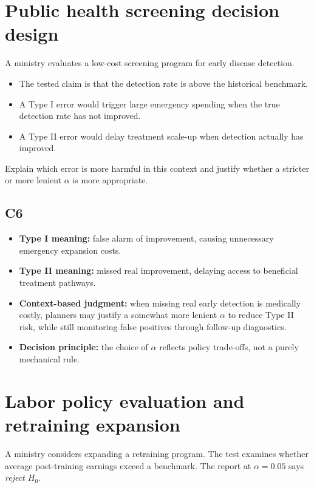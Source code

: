 	\section{Public health screening decision design}
	A ministry evaluates a low-cost screening program for early disease detection.
	\begin{itemize}
		\item The tested claim is that the detection rate is above the historical benchmark.
		\item A Type I error would trigger large emergency spending when the true detection rate has not improved.
		\item A Type II error would delay treatment scale-up when detection actually has improved.
	\end{itemize}
	Explain which error is more harmful in this context and justify whether a stricter or more lenient \(\alpha\) is more appropriate.
	
	\begin{center}
		\hspace{0.8cm}
	\end{center}
	
	\subsection*{C6}
	\begin{itemize}
		\item \textbf{Type I meaning:} false alarm of improvement, causing unnecessary emergency expansion costs.
		\item \textbf{Type II meaning:} missed real improvement, delaying access to beneficial treatment pathways.
		\item \textbf{Context-based judgment:} when missing real early detection is medically costly, planners may justify a somewhat more lenient \(\alpha\) to reduce Type II risk, while still monitoring false positives through follow-up diagnostics.
		\item \textbf{Decision principle:} the choice of \(\alpha\) reflects policy trade-offs, not a purely mechanical rule.
	\end{itemize}
	
	\section{Labor policy evaluation and retraining expansion}
	A ministry considers expanding a retraining program. The test examines whether average post-training earnings exceed a benchmark. The report at \(\alpha=0.05\) says \textit{reject \(H_0\)}.
	

